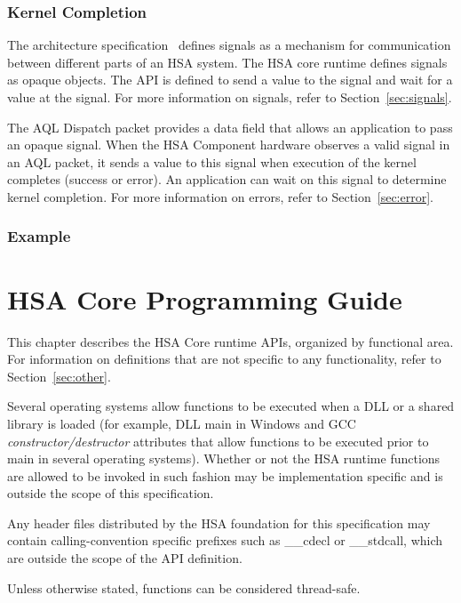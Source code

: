 \documentclass[final]{book}
\begin{document}
\subsection{Kernel Completion}
The architecture specification~\cite{sar} defines signals as a mechanism for
communication between different parts of an HSA system. The HSA core runtime 
defines signals as opaque objects. The API is defined to send a value to the 
signal and wait for a value at the signal. For more information on signals, 
refer to Section~\ref{sec:signals}.

The AQL Dispatch packet provides a data field that allows an application to pass 
an opaque signal. When the HSA Component hardware observes a valid signal in 
an AQL packet, it sends a value to this signal when execution of the kernel 
completes (success or error). An application can wait on this signal to determine 
kernel completion. For more information on errors, refer to 
Section~\ref{sec:error}.

\subsection{Example}


\chapter{HSA Core Programming Guide} \label{coreapi}

This chapter describes the HSA Core runtime APIs, organized by functional
area. For information on definitions that are not specific to any functionality, 
refer to Section~\ref{sec:other}.

Several operating systems allow functions to be executed when a DLL or a shared
library is loaded (for example, DLL main in Windows and GCC
\emph{constructor/destructor} attributes that allow functions to be executed
prior to main in several operating systems). Whether or not the HSA runtime
functions are allowed to be invoked in such fashion may be implementation
specific and is outside the scope of this specification.

Any header files distributed by the HSA foundation for this specification may
contain calling-convention specific prefixes such as __cdecl or __stdcall, which
are outside the scope of the API definition.

Unless otherwise stated, functions can be considered thread-safe.
\end{document}
